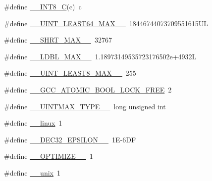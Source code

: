 \begin{DoxyCompactItemize}
\#define \hyperlink{build-analizer__host-_desktop___qt__5__9__0___g_c_c__64bit-debug_2moc__predefs_8h_ad36bc14a0433c9f88496bed4ccbd65a3}{\+\_\+\+\_\+\+I\+N\+T8\+\_\+\+C}(c)~c
\item 
\#define \hyperlink{build-analizer__host-_desktop___qt__5__9__0___g_c_c__64bit-debug_2moc__predefs_8h_a4bf843ffcadf9b162b74c1b7e546e8e9}{\+\_\+\+\_\+\+U\+I\+N\+T\+\_\+\+L\+E\+A\+S\+T64\+\_\+\+M\+A\+X\+\_\+\+\_\+}~18446744073709551615\+U\+L
\item 
\#define \hyperlink{build-analizer__host-_desktop___qt__5__9__0___g_c_c__64bit-debug_2moc__predefs_8h_a4f69990d03f9fb0c390a6fbad28a737b}{\+\_\+\+\_\+\+S\+H\+R\+T\+\_\+\+M\+A\+X\+\_\+\+\_\+}~32767
\item 
\#define \hyperlink{build-analizer__host-_desktop___qt__5__9__0___g_c_c__64bit-debug_2moc__predefs_8h_a06fd91f0507a4f364e469c8055f4265a}{\+\_\+\+\_\+\+L\+D\+B\+L\+\_\+\+M\+A\+X\+\_\+\+\_\+}~1.\+18973149535723176502e+4932\+L
\item 
\#define \hyperlink{build-analizer__host-_desktop___qt__5__9__0___g_c_c__64bit-debug_2moc__predefs_8h_aaf06a1464d33431377a2ee5293ec70d2}{\+\_\+\+\_\+\+U\+I\+N\+T\+\_\+\+L\+E\+A\+S\+T8\+\_\+\+M\+A\+X\+\_\+\+\_\+}~255
\item 
\#define \hyperlink{build-analizer__host-_desktop___qt__5__9__0___g_c_c__64bit-debug_2moc__predefs_8h_a9685ff8e617f3c5892c2a6fe3484f3b7}{\+\_\+\+\_\+\+G\+C\+C\+\_\+\+A\+T\+O\+M\+I\+C\+\_\+\+B\+O\+O\+L\+\_\+\+L\+O\+C\+K\+\_\+\+F\+R\+E\+E}~2
\item 
\#define \hyperlink{build-analizer__host-_desktop___qt__5__9__0___g_c_c__64bit-debug_2moc__predefs_8h_ab86380373ae9fa385c8a2464023774a8}{\+\_\+\+\_\+\+U\+I\+N\+T\+M\+A\+X\+\_\+\+T\+Y\+P\+E\+\_\+\+\_\+}~long unsigned int
\item 
\#define \hyperlink{build-analizer__host-_desktop___qt__5__9__0___g_c_c__64bit-debug_2moc__predefs_8h_a6c6342c53a7213211680dc5caae14491}{\+\_\+\+\_\+linux}~1
\item 
\#define \hyperlink{build-analizer__host-_desktop___qt__5__9__0___g_c_c__64bit-debug_2moc__predefs_8h_a13526b223391d4982c4c172c29bfdc1e}{\+\_\+\+\_\+\+D\+E\+C32\+\_\+\+E\+P\+S\+I\+L\+O\+N\+\_\+\+\_\+}~1\+E-\/6\+D\+F
\item 
\#define \hyperlink{build-analizer__host-_desktop___qt__5__9__0___g_c_c__64bit-debug_2moc__predefs_8h_a5bcf2962d7a37c34484cef13fa9601b2}{\+\_\+\+\_\+\+O\+P\+T\+I\+M\+I\+Z\+E\+\_\+\+\_\+}~1
\item 
\#define \hyperlink{build-analizer__host-_desktop___qt__5__9__0___g_c_c__64bit-debug_2moc__predefs_8h_ac3cd8b035cfb8a68f6d1119ace36f1cc}{\+\_\+\+\_\+unix}~1

\end{DoxyCompactItemize}
